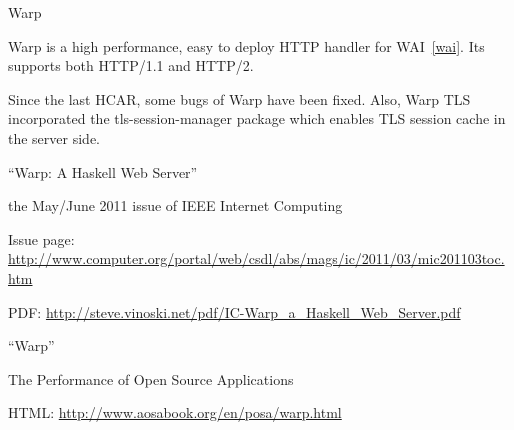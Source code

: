 \begin{hcarentry}[updated]{Warp}
\label{warp}
\makeheader

Warp is a high performance, easy to deploy HTTP handler for WAI~\cref{wai}.
Its supports both HTTP/1.1 and HTTP/2.

Since the last HCAR, some bugs of Warp have been fixed.
Also, Warp TLS incorporated the tls-session-manager package
which enables TLS session cache in the server side.

\FurtherReading
\begin{compactitem}
\item``Warp: A Haskell Web Server''
  \begin{compactitem}
  \item the May/June 2011 issue of IEEE Internet Computing
  \item Issue page: \url{http://www.computer.org/portal/web/csdl/abs/mags/ic/2011/03/mic201103toc.htm}
  \item  PDF: \url{http://steve.vinoski.net/pdf/IC-Warp\_a\_Haskell\_Web\_Server.pdf}
  \end{compactitem}
\item ``Warp''
  \begin{compactitem}
  \item The Performance of Open Source Applications
  \item HTML: \url{http://www.aosabook.org/en/posa/warp.html}
  \end{compactitem}
\end{compactitem}
\end{hcarentry}
